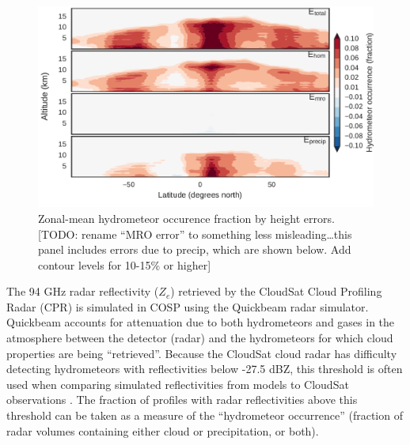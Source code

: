 \begin{figure}[htbp]
\centering
\includegraphics{graphics/subgrid1_hfba_zonal_diff.pdf}
\caption{\label{fig:hfbaZonalMroDiff}Zonal-mean hydrometeor occurence
fraction by height errors. {[}TODO: rename ``MRO error'' to something
less misleading\ldots{}this panel includes errors due to precip, which
are shown below. Add contour levels for 10-15\% or
higher{]}}\label{fig:hfbaZonalMroDiff}
\end{figure}

The 94 GHz radar reflectivity (\(Z_e\)) retrieved by the CloudSat Cloud
Profiling Radar (CPR) is simulated in COSP using the Quickbeam
\citep{haynes_et_al_2007} radar simulator. Quickbeam accounts for
attenuation due to both hydrometeors and gases in the atmosphere between
the detector (radar) and the hydrometeors for which cloud properties are
being ``retrieved''. Because the CloudSat cloud radar has difficulty
detecting hydrometeors with reflectivities below -27.5 dBZ, this
threshold is often used when comparing simulated reflectivities from
models to CloudSat observations \citep{marchand_et_al_2009}. The
fraction of profiles with radar reflectivities above this threshold can
be taken as a measure of the ``hydrometeor occurrence'' (fraction of
radar volumes containing either cloud or precipitation, or both).

